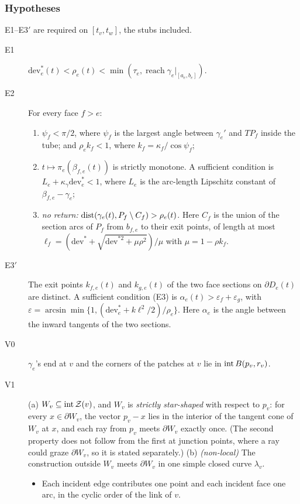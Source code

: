 \subsubsection*{Hypotheses}
E1--E3$'$ are required on $[t_v,t_w]$, the stubs included.
\begin{description}
\item[E1] $\mathrm{dev}^*_e(t)<\rho_e(t)<\min(\tau_e,\operatorname{reach}\gamma_e|_{[a_e,b_e]})$.
\item[E2] For every face $f>e$:
  \begin{enumerate}
  \item $\psi_f<\pi/2$, where $\psi_f$ is the largest angle between $\gamma_e'$ and $T P_f$ inside the tube;
  and $\rho_e k_f<1$, where $k_f=\kappa_f/\cos\psi_f$;
  \item $t\mapsto\pi_e(\beta_{f,e}(t))$ is strictly monotone. A sufficient condition is $L_e+\kappa_\gamma
  \mathrm{dev}^*_e<1$, where $L_e$ is the arc-length Lipschitz constant of $\beta_{f,e}-\gamma_e$;
  \item \emph{no return:} $\operatorname{dist}(\gamma_e(t),P_f\setminus C_f)>\rho_e(t)$. Here $C_f$ is the union of the section
  arcs of $P_f$ from $b_{f,e}$ to their exit points, of length at most
  $\ell_f=(\mathrm{dev}^*+\sqrt{\mathrm{dev}^{*2}+\mu\rho^2})/\mu$ with $\mu=1-\rho k_f$.
  \end{enumerate}
\item[E3$'$] The exit points $k_{f,e}(t)$ and $k_{g,e}(t)$ of the two face sections on $\partial D_e(t)$ are distinct.
A sufficient condition (E3) is $\alpha_e(t)>\varepsilon_f+\varepsilon_g$, with
$\varepsilon=\arcsin\min\{1,(\mathrm{dev}^*_e+k\ell^2/2)/\rho_e\}$. Here $\alpha_e$ is the angle between the inward
tangents of the two sections.
\item[V0] $\gamma_e$'s end at $v$ and the corners of the patches at $v$ lie in $\operatorname{int} B(p_v,r_v)$.
\item[V1] (a) $W_v\subseteq\operatorname{int}\mathcal{Z}(v)$, and $W_v$ is \emph{strictly star-shaped} with respect to $p_v$: for every
$x\in\partial W_v$, the vector $p_v-x$ lies in the interior of the tangent cone of $W_v$ at $x$, and each ray from
$p_v$ meets $\partial W_v$ exactly once. (The second property does not follow from the first at junction points, where a
ray could graze $\partial W_v$, so it is stated separately.)
(b) \emph{(non-local)} The construction outside $W_v$ meets $\partial W_v$ in one simple closed curve $\lambda_v$.
\begin{itemize}
\item Each incident edge contributes one point and each incident face one arc, in the cyclic order of the link of $v$.

\end{itemize}
\end{description}
